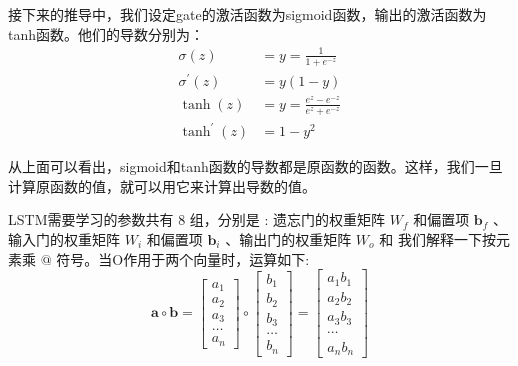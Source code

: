 \documentclass[10.5pt,compsoc]{CjC}
\theoremstyle{mystyle}
\begin{document}
接下来的推导中，我们设定gate的激活函数为sigmoid函数，输出的激活函数为tanh函数。他们的导数分别为：
$$
\begin{aligned}
\sigma(z) &=y=\frac{1}{1+e^{-z}} \\
\sigma^{\prime}(z) &=y(1-y) \\
\tanh (z) &=y=\frac{e^{z}-e^{-z}}{e^{z}+e^{-z}} \\
\tanh ^{\prime}(z) &=1-y^{2}
\end{aligned}
$$

从上面可以看出，sigmoid和tanh函数的导数都是原函数的函数。这样，我们一旦计算原函数的值，就可以用它来计算出导数的值。

LSTM需要学习的参数共有 8 组，分别是 : 遗忘门的权重矩阵 $W_{f}$ 和偏置项 $\mathbf{b}_{f}$ 、输入门的权重矩阵 $W_{i}$ 和偏置项 $\mathbf{b}_{i}$ 、输出门的权重矩阵 $W_{o}$ 和 我们解释一下按元素乘 $@$ 符号。当O作用于两个向量时，运算如下:
$$
\mathbf{a} \circ \mathbf{b}=\left[\begin{array}{c}
a_{1} \\
a_{2} \\
a_{3} \\
\ldots \\
a_{n}
\end{array}\right] \circ\left[\begin{array}{c}
b_{1} \\
b_{2} \\
b_{3} \\
\ldots \\
b_{n}
\end{array}\right]=\left[\begin{array}{c}
a_{1} b_{1} \\
a_{2} b_{2} \\
a_{3} b_{3} \\
\cdots \\
a_{n} b_{n}
\end{array}\right]
$$
\end{document}

